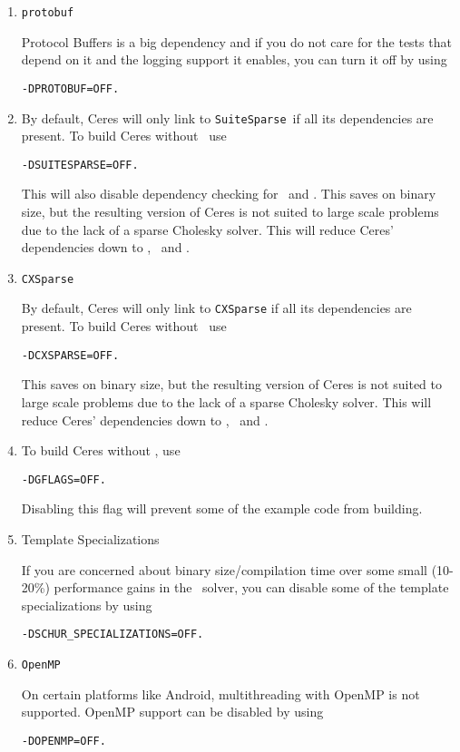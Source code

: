 \begin{enumerate}
\item{\texttt{protobuf}}


Protocol Buffers is a big dependency and if you do not care for the tests that depend on it and the logging support it enables, you can turn it off by using
\begin{verbatim}
-DPROTOBUF=OFF.
\end{verbatim}

\item{\suitesparse}

By default, Ceres will only link to \texttt{SuiteSparse}\  if all its dependencies are present.
To build Ceres without \suitesparse\ use
\begin{verbatim}
-DSUITESPARSE=OFF.
\end{verbatim}
 This will also disable dependency checking for \lapack\ and \blas. This saves on binary size, but the resulting version of Ceres is not suited
to large scale problems due to the lack of a sparse Cholesky solver.  This will reduce Ceres' dependencies down to
\eigen, \gflags\ and \glog.

\item{\texttt{CXSparse}}

By default, Ceres will only link to \texttt{CXSparse} if all its dependencies are present.
To build Ceres without \suitesparse\ use
\begin{verbatim}
-DCXSPARSE=OFF.
\end{verbatim}

This saves on binary size, but the resulting version of Ceres is not suited to large scale problems due to the lack of a sparse Cholesky solver.  This will reduce Ceres' dependencies down to
\eigen, \gflags\ and \glog.

\item{\gflags}
To build Ceres without \gflags, use
\begin{verbatim}
-DGFLAGS=OFF.
\end{verbatim}
Disabling this flag will prevent some of the example code from building.

\item{Template Specializations}


If you are concerned about binary size/compilation time over some
small (10-20\%) performance gains in the \sparseschur\ solver, you can disable some of the template
specializations by using
\begin{verbatim}
-DSCHUR_SPECIALIZATIONS=OFF.
\end{verbatim}

\item{\texttt{OpenMP}}


On certain platforms like Android, multithreading with OpenMP is not supported. OpenMP support can be disabled by using
\begin{verbatim}
-DOPENMP=OFF.
\end{verbatim}
\end{enumerate}

